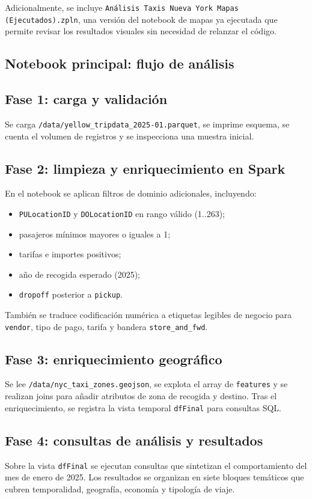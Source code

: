 Adicionalmente, se incluye \texttt{Análisis Taxis Nueva York Mapas (Ejecutados).zpln},
una versión del notebook de mapas ya ejecutada que permite revisar los resultados
visuales sin necesidad de relanzar el código.

\subsection{Notebook principal: flujo de análisis}

\subsection{Fase 1: carga y validación}
Se carga \texttt{/data/yellow\_tripdata\_2025-01.parquet}, se imprime esquema,
se cuenta el volumen de registros y se inspecciona una muestra inicial.

\subsection{Fase 2: limpieza y enriquecimiento en Spark}
En el notebook se aplican filtros de dominio adicionales, incluyendo:

\begin{itemize}
	\item \texttt{PULocationID} y \texttt{DOLocationID} en rango válido (1..263);
	\item pasajeros mínimos mayores o iguales a 1;
	\item tarifas e importes positivos;
	\item año de recogida esperado (2025);
	\item \texttt{dropoff} posterior a \texttt{pickup}.
\end{itemize}

También se traduce codificación numérica a etiquetas legibles de negocio para
\texttt{vendor}, tipo de pago, tarifa y bandera \texttt{store\_and\_fwd}.

\subsection{Fase 3: enriquecimiento geográfico}
Se lee \texttt{/data/nyc\_taxi\_zones.geojson}, se explota el array de
\texttt{features} y se realizan joins para añadir atributos de zona de recogida y
destino. Tras el enriquecimiento, se registra la vista temporal
\texttt{dfFinal} para consultas SQL.

\subsection{Fase 4: consultas de análisis y resultados}
Sobre la vista \texttt{dfFinal} se ejecutan consultas que sintetizan el
comportamiento del mes de enero de 2025. Los resultados se organizan en siete
bloques temáticos que cubren temporalidad, geografía, economía y tipología de
viaje.

